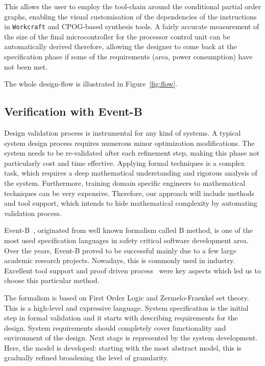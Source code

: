 \documentclass[conference]{IEEEtran}
\begin{document}
This allows the user to employ the tool-chain around the conditional partial order
graphs, enabling the visual customisation of the dependencies of the instructions in 
\verb|Workcraft| and CPOG-based synthesis tools. A fairly
accurate measurement of the size of the final microcontroller for the processor control
unit can be automatically derived therefore, allowing the designer to come back at the
specification phase if some of the requirements (area, power consumption) have not been
met.

The whole design-flow is illustrated in Figure~\ref{fig:flow}.

\subsection{Verification with Event-B}
\label{sec:ver}
Design validation process is instrumental for any kind of systems. A typical system design
process requires numerous minor optimization modifications. The system needs to be 
re-validated after each refinement step, making this phase not particularly cost and time
effective. Applying formal techniques is a complex task, which requires a deep mathematical
understanding and rigorous analysis of the system. Furthermore, training domain specific
engineers to mathematical techniques can be very expensive. Therefore, our approach will
include methods and tool support, which intends to hide mathematical complexity by automating
validation process. 

Event-B~\cite{eventbbook}, originated from well known formalism called B method, is one of the most used
specification languages in safety critical software development area. Over the years, Event-B
proved to be successful mainly due to a few large academic research projects. Nowadays, this
is commonly used in industry. Excellent tool support and proof driven process~\cite{summevent} 
were key aspects which led us to choose this particular method.

The formalism is based on First Order Logic and Zermelo-Fraenkel set theory. This is a
high-level and expressive language. System specification is the initial
step in formal validation and it starts with describing requirements for the design. System
requirements should completely cover functionality and environment of the design. Next stage
is represented by the system development. Here, the model is developed: starting with the most
abstract model, this is gradually refined broadening the level of granularity.
\end{document}
